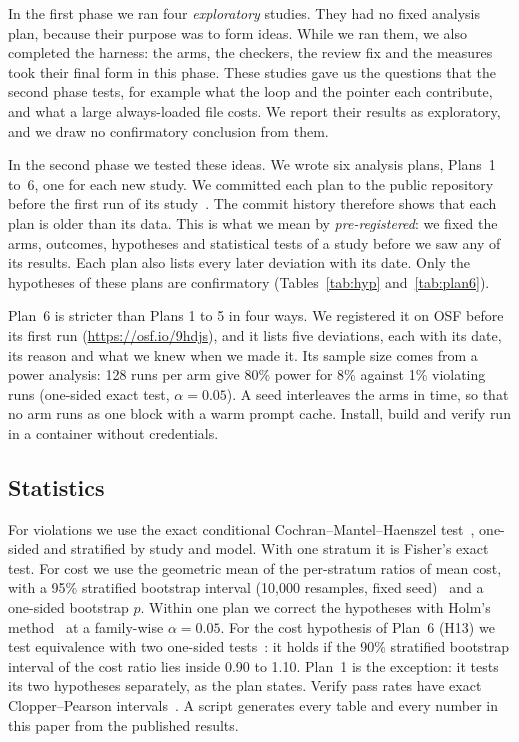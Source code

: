 \documentclass[pdflatex,sn-mathphys-num]{sn-jnl}
\begin{document}
In the first phase we ran four \emph{exploratory} studies.
They had no fixed analysis plan, because their purpose was to form ideas.
While we ran them, we also completed the harness: the arms, the checkers, the review fix and the measures took their final form in this phase.
These studies gave us the questions that the second phase tests, for example what the loop and the pointer each contribute, and what a large always-loaded file costs.
We report their results as exploratory, and we draw no confirmatory conclusion from them.

In the second phase we tested these ideas.
We wrote six analysis plans, Plans~1 to~6, one for each new study.
We committed each plan to the public repository before the first run of its study~\cite{nosek2018prereg,ernst2023registered}.
The commit history therefore shows that each plan is older than its data.
This is what we mean by \emph{pre-registered}: we fixed the arms, outcomes, hypotheses and statistical tests of a study before we saw any of its results.
Each plan also lists every later deviation with its date.
Only the hypotheses of these plans are confirmatory (Tables~\ref{tab:hyp} and~\ref{tab:plan6}).

Plan~6 is stricter than Plans 1 to 5 in four ways.
We registered it on OSF before its first run (\url{https://osf.io/9hdjs}), and it lists five deviations, each with its date, its reason and what we knew when we made it.
Its sample size comes from a power analysis: 128 runs per arm give 80\% power for 8\% against 1\% violating runs (one-sided exact test, $\alpha=0.05$).
A seed interleaves the arms in time, so that no arm runs as one block with a warm prompt cache.
Install, build and verify run in a container without credentials.

\subsection{Statistics}

For violations we use the exact conditional Cochran--Mantel--Haenszel test~\cite{mantel1959}, one-sided and stratified by study and model.
With one stratum it is Fisher's exact test.
For cost we use the geometric mean of the per-stratum ratios of mean cost, with a 95\% stratified bootstrap interval (10{,}000 resamples, fixed seed)~\cite{efron1993bootstrap} and a one-sided bootstrap $p$.
Within one plan we correct the hypotheses with Holm's method~\cite{holm1979} at a family-wise $\alpha=0.05$.
For the cost hypothesis of Plan~6 (H13) we test equivalence with two one-sided tests~\cite{schuirmann1987tost,lakens2017equivalence}: it holds if the 90\% stratified bootstrap interval of the cost ratio lies inside 0.90 to 1.10.
Plan~1 is the exception: it tests its two hypotheses separately, as the plan states.
Verify pass rates have exact Clopper--Pearson intervals~\cite{clopper1934}.
A script generates every table and every number in this paper from the published results.
\end{document}
